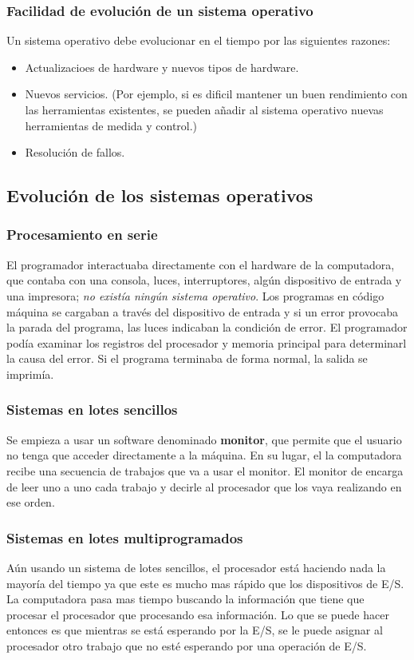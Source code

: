 \documentclass[12pt]{article}
\begin{document}
  \subsubsection{Facilidad de evolución de un sistema operativo}
  Un sistema operativo debe evolucionar en el tiempo por las siguientes razones:
  \begin{itemize}
    \item Actualizacioes de hardware y nuevos tipos de hardware.

    \item Nuevos servicios. (Por ejemplo, si es dificil mantener un buen rendimiento con las herramientas existentes, se pueden añadir al sistema operativo nuevas herramientas de medida y control.)

    \item Resolución de fallos.
  \end{itemize}

  \subsection{Evolución de los sistemas operativos}
  \subsubsection{Procesamiento en serie}
  El programador interactuaba directamente con el hardware de la computadora, que contaba con una consola, luces, interruptores, algún dispositivo de entrada y una impresora; \textit{no existía ningún sistema operativo}. Los programas en código máquina se cargaban a través del dispositivo de entrada y si un error provocaba la parada del programa, las luces indicaban la condición de error. El programador podía examinar los registros del procesador y memoria principal para determinarl la causa del error. Si el programa terminaba de forma normal, la salida se imprimía.

  \subsubsection{Sistemas en lotes sencillos}
  Se empieza a usar un software denominado \textbf{monitor}, que permite que el usuario no tenga que acceder directamente a la máquina. En su lugar, el la computadora recibe una secuencia de trabajos que va a usar el monitor. El monitor de encarga de leer uno a uno cada trabajo y decirle al procesador que los vaya realizando en ese orden.

  \subsubsection{Sistemas en lotes multiprogramados}
  Aún usando un sistema de lotes sencillos, el procesador está haciendo nada la mayoría del tiempo ya que este es mucho mas rápido que los dispositivos de E/S. La computadora pasa mas tiempo buscando la información que tiene que procesar el procesador que procesando esa información. Lo que se puede hacer entonces es que mientras se está esperando por la E/S, se le puede asignar al procesador otro trabajo que no esté esperando por una operación de E/S. 
\end{document}

